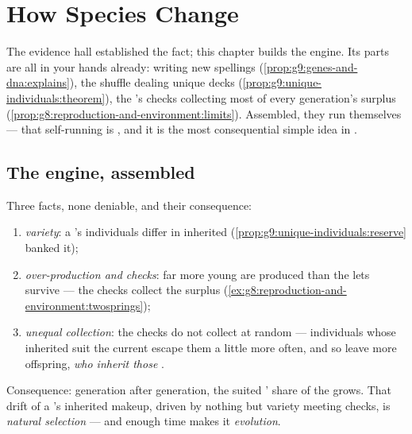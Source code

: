\chapter{How Species Change}\label{ch:g9:how-species-change}

The evidence hall established the fact; this chapter builds
the engine. Its parts are all in your hands already:
 writing new spellings
(\cref{prop:g9:genes-and-dna:explains}), the shuffle dealing
unique decks (\cref{prop:g9:unique-individuals:theorem}),
the 's checks collecting most of every
generation's surplus
(\cref{prop:g8:reproduction-and-environment:limits}).
Assembled, they run themselves --- that self-running is
, and it is the most consequential simple
idea in .

\section{The engine, assembled}

\begin{proposition}\label{prop:g9:how-species-change:selection}
Three facts, none deniable, and their consequence:
\begin{enumerate}
  \item \emph{variety}: a 's individuals differ
        in inherited 
        (\cref{prop:g9:unique-individuals:reserve} banked
        it);
  \item \emph{over-production and checks}: far more young
        are produced than the  lets survive ---
        the checks collect the surplus
        (\cref{ex:g8:reproduction-and-environment:twosprings});
  \item \emph{unequal collection}: the checks do not
        collect at random --- individuals whose inherited
         suit the current  escape them a
        little more often, and so leave more offspring,
        \emph{who inherit those }.
\end{enumerate}
Consequence: generation after generation, the suited
' share of the  grows. That drift of a
's inherited makeup, driven by nothing but
variety meeting checks, is \emph{natural
selection} --- and enough time
makes it \emph{evolution}.
\end{proposition}
\admitted

